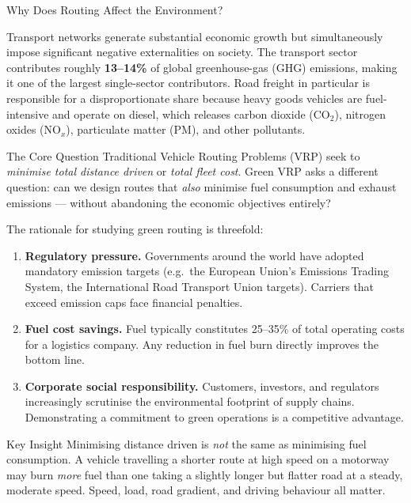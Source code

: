 \documentclass[aspectratio=169,10pt]{beamer}
\begin{document}
\begin{frame}[allowframebreaks]{Why Does Routing Affect the Environment?}

  Transport networks generate substantial economic growth but simultaneously
  impose significant negative externalities on society.  The transport sector
  contributes roughly \textbf{13--14\%} of global greenhouse-gas (GHG) emissions,
  making it one of the largest single-sector contributors.
  Road freight in particular is responsible for a disproportionate share because
  heavy goods vehicles are fuel-intensive and operate on diesel, which releases
  carbon dioxide (CO$_2$), nitrogen oxides (NO$_x$), particulate matter (PM),
  and other pollutants.

  \begin{block}{The Core Question}
    Traditional Vehicle Routing Problems (VRP) seek to \emph{minimise total
    distance driven} or \emph{total fleet cost}.  Green VRP asks a different
    question: can we design routes that \emph{also} minimise fuel consumption
    and exhaust emissions --- without abandoning the economic objectives
    entirely?
  \end{block}

  \framebreak

  The rationale for studying green routing is threefold:

  \begin{enumerate}
    \item \textbf{Regulatory pressure.}  Governments around the world have
    adopted mandatory emission targets (e.g.\ the European Union's Emissions
    Trading System, the International Road Transport Union targets).
    Carriers that exceed emission caps face financial penalties.

    \item \textbf{Fuel cost savings.}  Fuel typically constitutes 25--35\% of
    total operating costs for a logistics company.  Any reduction in fuel burn
    directly improves the bottom line.

    \item \textbf{Corporate social responsibility.}  Customers, investors, and
    regulators increasingly scrutinise the environmental footprint of supply
    chains.  Demonstrating a commitment to green operations is a competitive
    advantage.
  \end{enumerate}

  \begin{alertblock}{Key Insight}
    Minimising distance driven is \emph{not} the same as minimising fuel
    consumption.  A vehicle travelling a shorter route at high speed on a
    motorway may burn \emph{more} fuel than one taking a slightly longer but
    flatter road at a steady, moderate speed.
    Speed, load, road gradient, and driving behaviour all matter.
  \end{alertblock}


\end{frame}
\end{document}
